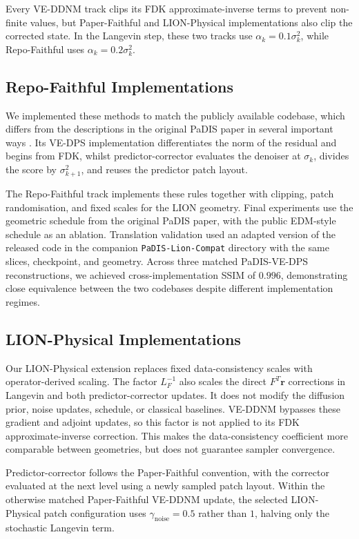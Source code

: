 Every VE-DDNM track clips its FDK approximate-inverse terms to prevent non-finite values, but Paper-Faithful and LION-Physical implementations also clip the corrected state. In the Langevin step, these two tracks use $\alpha_k=0.1\sigma_k^2$, while Repo-Faithful uses $\alpha_k=0.2\sigma_k^2$.

\subsection{Repo-Faithful Implementations}
\label{subsec:repo-faithful-implementation}
We implemented these methods to match the publicly available codebase, which differs from the descriptions in the original PaDIS paper in several important ways \cite{hu_learning_2024,hu_jasonhu4padis_2026-1}. Its VE-DPS implementation differentiates the norm of the residual and begins from FDK, whilst predictor-corrector evaluates the denoiser at $\sigma_k$, divides the score by $\sigma_{k+1}^2$, and reuses the predictor patch layout.

The Repo-Faithful track implements these rules together with clipping, patch randomisation, and fixed scales for the LION geometry. Final experiments use the geometric schedule from the original PaDIS paper, with the public EDM-style schedule as an ablation. Translation validation used an adapted version of the released code in the companion \texttt{PaDIS-Lion-Compat} directory with the same slices, checkpoint, and geometry. Across three matched PaDIS-VE-DPS reconstructions, we achieved cross-implementation SSIM of $0.996$, demonstrating close equivalence between the two codebases despite different implementation regimes.

\subsection{LION-Physical Implementations}
\label{subsec:lion-physical-implementations}
Our LION-Physical extension replaces fixed data-consistency scales with operator-derived scaling. The factor $L_F^{-1}$ also scales the direct $F^T\mathbf{r}$ corrections in Langevin and both predictor-corrector updates. It does not modify the diffusion prior, noise updates, schedule, or classical baselines. VE-DDNM bypasses these gradient and adjoint updates, so this factor is not applied to its FDK approximate-inverse correction. This makes the data-consistency coefficient more comparable between geometries, but does not guarantee sampler convergence.

Predictor-corrector follows the Paper-Faithful convention, with the corrector evaluated at the next level using a newly sampled patch layout. Within the otherwise matched Paper-Faithful VE-DDNM update, the selected LION-Physical patch configuration uses $\gamma_{\mathrm{noise}}=0.5$ rather than $1$, halving only the stochastic Langevin term.

